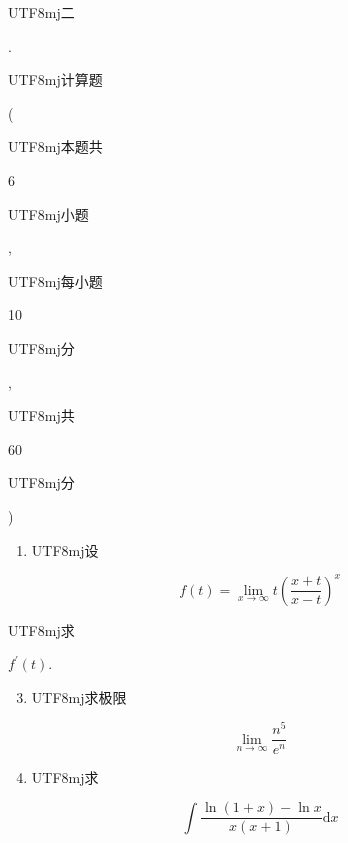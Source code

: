 \documentclass[10pt]{article}
\begin{document}
\begin{CJK}{UTF8}{mj}二\end{CJK}. \begin{CJK}{UTF8}{mj}计算题\end{CJK} (\begin{CJK}{UTF8}{mj}本题共\end{CJK} 6 \begin{CJK}{UTF8}{mj}小题\end{CJK}, \begin{CJK}{UTF8}{mj}每小题\end{CJK} 10 \begin{CJK}{UTF8}{mj}分\end{CJK}, \begin{CJK}{UTF8}{mj}共\end{CJK} 60 \begin{CJK}{UTF8}{mj}分\end{CJK})

\begin{enumerate}
  \item \begin{CJK}{UTF8}{mj}设\end{CJK}
\end{enumerate}
$$
f(t)=\lim _{x \rightarrow \infty} t\left(\frac{x+t}{x-t}\right)^{x}
$$
\begin{CJK}{UTF8}{mj}求\end{CJK} $f^{\prime}(t)$.

\begin{enumerate}
  \setcounter{enumi}{2}
  \item \begin{CJK}{UTF8}{mj}求极限\end{CJK}
\end{enumerate}
$$
\lim _{n \rightarrow \infty} \frac{n^{5}}{e^{n}}
$$

\begin{enumerate}
  \setcounter{enumi}{3}
  \item \begin{CJK}{UTF8}{mj}求\end{CJK}
\end{enumerate}
$$
\int \frac{\ln (1+x)-\ln x}{x(x+1)} \mathrm{d} x
$$
\end{document}
